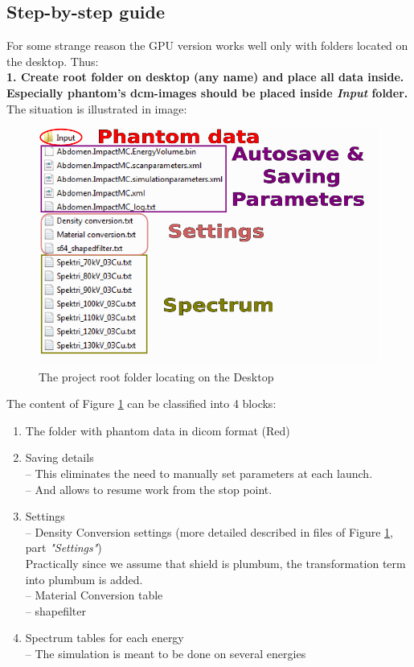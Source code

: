 \documentclass[fleqn,10pt]{SelfArx} %
\begin{document}
\subsection{Step-by-step guide}
For some strange reason the GPU version works well only with folders located on the desktop. Thus:\\
\textbf{1. Create root folder on desktop (any name) and place all data inside. Especially phantom's dcm-images should be placed inside  \textit{Input}  folder. }\\
The situation is illustrated in image: \\
\begin{figure}[ht]\centering
\includegraphics[width=\linewidth]{folderStructure}
\caption{The project root folder locating on the Desktop}
\label{fig:folderStructure}
\end{figure}

The content of Figure \ref{fig:folderStructure} can be classified into 4 blocks:
\begin{enumerate}
\item The folder with phantom data in dicom format (Red)
\item Saving details\\
-- This eliminates the need to manually set parameters at each launch.\\
-- And allows to resume work from the stop point.
\item Settings\\
-- Density Conversion settings (more detailed described in files of Figure \ref{fig:folderStructure}, part \textit{"Settings"})\\ 
Practically since we assume that shield is plumbum, the transformation term into plumbum is added.\\
-- Material Conversion table\\
-- shapefilter\\
\item Spectrum tables for each energy\\
-- The simulation is meant to be done on several energies

\end{enumerate}
\end{document}
